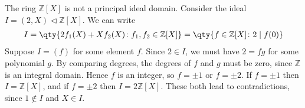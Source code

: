 \begin{example}
	The ring $\mathbb Z[X]$ is not a principal ideal domain.
	Consider the ideal $I = (2, X) \triangleleft \mathbb Z[X]$.
	We can write
	\begin{align*}
		I = \qty{2f_1(X) + Xf_2(X) \colon f_1, f_2 \in \mathbb Z[X]} = \qty{f \in \mathbb Z[X] \colon 2\mid f(0)}
	\end{align*}
	Suppose $I = (f)$ for some element $f$.
	Since $2 \in I$, we must have $2 = fg$ for some polynomial $g$.
	By comparing degrees, the degrees of $f$ and $g$ must be zero, since $\mathbb Z$ is an integral domain.
	Hence $f$ is an integer, so $f = \pm 1$ or $f = \pm 2$.
	If $f = \pm 1$ then $I = \mathbb Z[X]$, and if $f = \pm 2$ then $I = 2\mathbb Z[X]$.
	These both lead to contradictions, since $1 \not\in I$ and $X \in I$.
\end{example}

